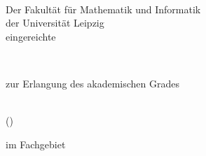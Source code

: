 \begin{titlepage}
	\begin{addmargin}[-0.5cm]{-3cm}
    \begin{center}
        \large  

        \hfill

        \vfill
        
        \begingroup
            \spacedallcaps{\myTitle} \\ \bigskip
            \mySubtitle
        \endgroup
        
        \vfill
        
         \begingroup
             {Der Fakult\"at f\"ur Mathematik und Informatik} \\
             {der Universit\"at Leipzig} \\
             {eingereichte} \\ \bigskip
         \endgroup
         

        \bigskip
        
        \begingroup
            {\spacedallcaps{\myDocumentType}} \\ \bigskip
        \endgroup
        
        \bigskip
        
        \begingroup
           {zur Erlangung des akademischen Grades} \\ \bigskip
        \endgroup
        
        \bigskip

        \begingroup
            {\spacedallcaps{\myNewDegree}} \\
            {(\myNewDegreeAbr)} \\ \bigskip
        \endgroup

        \bigskip

        \begingroup
            {im Fachgebiet} \\ \bigskip
            {} \\ \bigskip
        \endgroup


\end{center}
\end{addmargin}
\end{titlepage}
